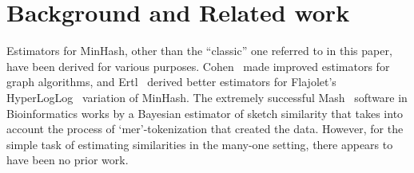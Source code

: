 
\section{Background and Related work}

Estimators for MinHash, other than the ``classic'' one referred to in this paper, have been derived for various purposes.
Cohen~\cite{DBLP:reference/algo/Cohen16b} made improved estimators for graph algorithms,
and Ertl~\cite{DBLP:journals/corr/Ertl17} derived better estimators for Flajolet's HyperLogLog~\cite{flajolet1985probabilistic} variation of MinHash.
%
The extremely successful Mash~\cite{ondov2016mash} software in Bioinformatics works by
a Bayesian estimator of sketch similarity that takes into account the process of `mer'-tokenization that created the data.
However, for the simple task of estimating similarities in the many-one setting, there appears to have been no prior work.





